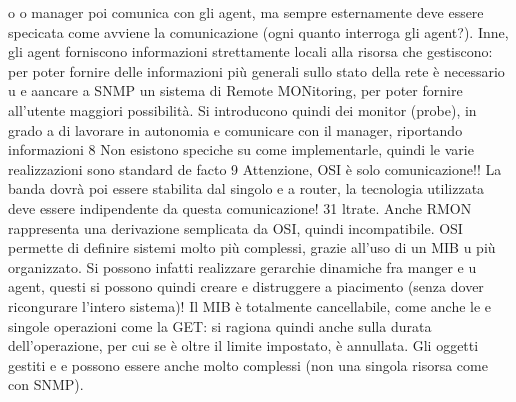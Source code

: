 o
o
manager poi comunica con gli agent, ma sempre esternamente deve essere specicata come avviene la comunicazione (ogni
quanto interroga gli agent?). Inne,
gli agent forniscono informazioni strettamente locali alla risorsa che gestiscono:
per poter fornire delle informazioni più generali sullo stato della rete è necessario
u
e
aancare a SNMP un sistema di Remote MONitoring, per poter fornire all'utente maggiori possibilità. Si introducono quindi
dei monitor (probe), in grado
a
di lavorare in autonomia e comunicare con il manager, riportando informazioni
8 Non esistono speciche su come implementarle, quindi le varie realizzazioni sono standard
de facto
9 Attenzione, OSI è solo comunicazione!! La banda dovrà poi essere stabilita dal singolo
e
a
router, la tecnologia utilizzata deve essere indipendente da questa comunicazione!
31
ltrate. Anche RMON rappresenta una derivazione semplicata da OSI, quindi
incompatibile.
OSI permette di definire sistemi molto più complessi, grazie all'uso di un MIB
u
più organizzato. Si possono infatti realizzare gerarchie dinamiche fra manger e
u
agent, questi si possono quindi creare e distruggere a piacimento (senza dover
ricongurare l'intero sistema)! Il MIB è totalmente cancellabile, come anche le
e
singole operazioni come la GET: si ragiona quindi anche sulla durata dell'operazione, per cui se è oltre il limite
impostato, è annullata. Gli oggetti gestiti
e
e
possono essere anche molto complessi (non una singola risorsa come con SNMP).
